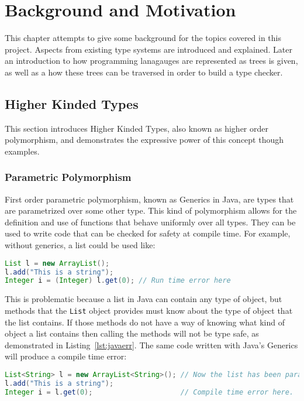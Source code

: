 \chapter{Background and Motivation}\label{sec:motivation} 
This chapter attempts to give some background for the topics covered in this
project. Aspects from existing type systems are introduced and explained.
Later an introduction to how programming lanagauges are represented as trees is
given, as well as a how these trees can be traversed in order to build a type 
checker. 

\section{Higher Kinded Types}
This section introduces Higher Kinded Types, also known as higher order
polymorphism, and demonstrates the expressive power of this concept though
examples.

\subsection{Parametric Polymorphism}\label{sec:generics}
First order parametric polymorphism, known as Generics in Java, are types that
are parametrized over some other type. This kind of polymorphism allows for the
definition and use of functions that behave uniformly over all types.  They can
be used to write code that can be checked for safety at compile time. For
example, without generics, a list could be used like:

\begin{lstlisting}[caption=Runtime error that could be avoided, language=Java, label={lst:javaerr}]
List l = new ArrayList();
l.add("This is a string");
Integer i = (Integer) l.get(0); // Run time error here
\end{lstlisting}

This is problematic because a list in Java can contain any type of object, but
methods that the \lstinline{List} object provides must know about the type of
object that the list contains. If those methods do not have a way of knowing
what kind of object a list contains then calling the methods will not be type
safe, as demonstrated in Listing~\ref{lst:javaerr}. The same code written with
Java's Generics will produce a compile time error:

\begin{lstlisting}[caption=Compile time error, language=Java, label={lst:generr}]
List<String> l = new ArrayList<String>(); // Now the list has been parametrized with a type
l.add("This is a string");
Integer i = l.get(0);                     // Compile time error here.
\end{lstlisting}

